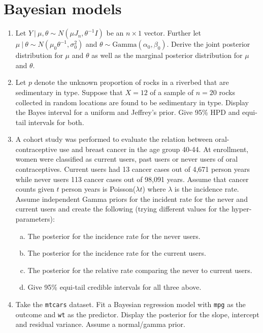 \documentclass[12pt]{article}
\begin{document}
\section{Bayesian models}
\begin{enumerate}
\item Let $Y ~|~ \mu, \theta \sim N(\mu J_{n}, \theta^{-1} I)$ be an $n\times 1$ vector. Further
let $\mu ~|~ \theta \sim N(\mu_0 \theta^{-1}, \sigma^2_0)$ and $\theta \sim \mbox{Gamma}(\alpha_0, \beta_0)$.
Derive the joint posterior distribution for $\mu$ and $\theta$ as well as the marginal posterior distribution 
for $\mu$ and $\theta$.
\item Let $p$ denote the unknown proportion of rocks in a riverbed that are
sedimentary in type. Suppose that $X = 12$ of a sample of $n = 20$ rocks collected in
random locations are found to be sedimentary in type. Display the Bayes interval for 
a uniform and Jeffrey's prior. Give 95\% HPD and equi-tail intervals for both.
\item A cohort study was performed to evaluate the relation between oral-contraceptive
use and breast cancer in the age group 40-44. At enrollment, women were classified
as current users, past users or never users of oral contraceptives. Current users had 13 cancer
cases out of 4,671 person years while never users 113 cancer cases out of 98,091 years.
Assume that cancer counts given $t$ person years is Poisson($\lambda t$) where $\lambda$
is the incidence rate. Assume independent Gamma priors for the incident rate for the never
and current users and create the following (trying different values for the hyper-parameters):
\begin{enumerate}[a.]
\item The posterior for the incidence rate for the never users.
\item The posterior for the incidence rate for the current users.
\item The posterior for the relative rate comparing the never to current users.
\item Give 95\% equi-tail credible intervals for all three above.
\end{enumerate}
\item Take the \texttt{mtcars} dataset. Fit a Bayesian regression model with 
\texttt{mpg} as the outcome and \texttt{wt} as the predictor. Display the posterior
for the slope, intercept and residual variance. Assume a normal/gamma prior.
\end{enumerate}
\end{document}

